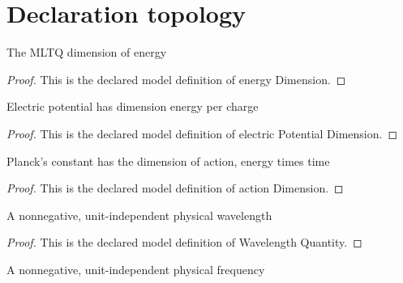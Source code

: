 \section{Declaration topology}
\begin{definition}
  \label{def:physics:phyx-mini-0516:phyxminiproblems-problemphyxmini0516-energydimension}
  The MLTQ dimension of energy
\end{definition}
\begin{proof}
  This is the declared model definition of energy Dimension.
\end{proof}
\begin{definition}
  \label{def:physics:phyx-mini-0516:phyxminiproblems-problemphyxmini0516-electricpotentialdimension}
  Electric potential has dimension energy per charge
\end{definition}
\begin{proof}
  This is the declared model definition of electric Potential Dimension.
\end{proof}
\begin{definition}
  \label{def:physics:phyx-mini-0516:phyxminiproblems-problemphyxmini0516-actiondimension}
  Planck's constant has the dimension of action, energy times time
\end{definition}
\begin{proof}
  This is the declared model definition of action Dimension.
\end{proof}
\begin{definition}
  \label{def:physics:phyx-mini-0516:phyxminiproblems-problemphyxmini0516-wavelengthquantity}
  A nonnegative, unit-independent physical wavelength
\end{definition}
\begin{proof}
  This is the declared model definition of Wavelength Quantity.
\end{proof}
\begin{definition}
  \label{def:physics:phyx-mini-0516:phyxminiproblems-problemphyxmini0516-frequencyquantity}
  A nonnegative, unit-independent physical frequency
\end{definition}
